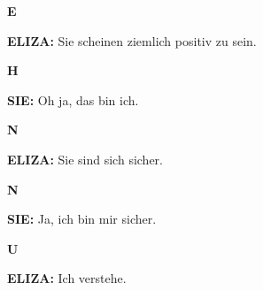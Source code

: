 \documentclass{article}
\begin{document}
\vspace{0.5cm}

\begin{minipage}[t]{0.13\textwidth}
  \centering
  {\bfseries\fontsize{14.4}{14.4}\selectfont\textcolor{pastelgreen}{E}}
\end{minipage}%
\begin{minipage}[t]{0.81\textwidth}
  \textbf{ELIZA:} Sie scheinen ziemlich positiv zu sein.
\end{minipage}

\vspace{0.5cm}

\begin{minipage}[t]{0.13\textwidth}
  \centering
  {\bfseries\fontsize{14.4}{14.4}\selectfont\textcolor{pastelgreen}{H}}
\end{minipage}%
\begin{minipage}[t]{0.81\textwidth}
  \textbf{SIE:} Oh ja, das bin ich.
\end{minipage}

\vspace{0.5cm}

\begin{minipage}[t]{0.13\textwidth}
  \centering
  {\bfseries\fontsize{14.4}{14.4}\selectfont\textcolor{pastelgreen}{N}}
\end{minipage}%
\begin{minipage}[t]{0.81\textwidth}
  \textbf{ELIZA:} Sie sind sich sicher.
\end{minipage}

\vspace{0.5cm}

\begin{minipage}[t]{0.13\textwidth}
  \centering
  {\bfseries\fontsize{14.4}{14.4}\selectfont\textcolor{pastelgreen}{N}}
\end{minipage}%
\begin{minipage}[t]{0.81\textwidth}
  \textbf{SIE:} Ja, ich bin mir sicher.
\end{minipage}

\vspace{0.5cm}

\begin{minipage}[t]{0.13\textwidth}
  \centering
  {\bfseries\fontsize{14.4}{14.4}\selectfont\textcolor{pastelgreen}{U}}
\end{minipage}%
\begin{minipage}[t]{0.81\textwidth}
  \textbf{ELIZA:} Ich verstehe.
\end{minipage}
\end{document}
